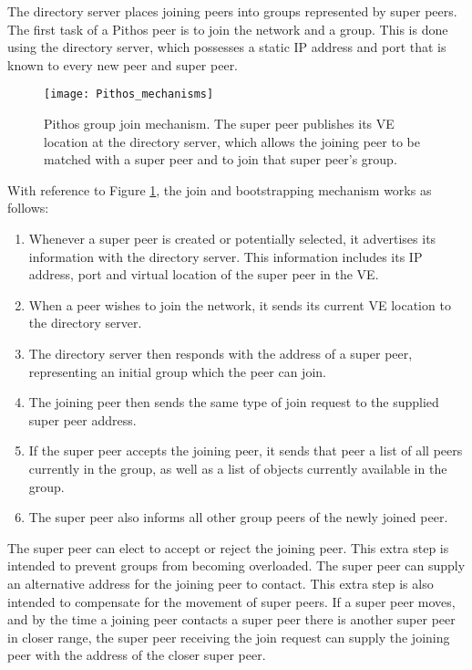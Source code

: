 The directory server places joining peers into groups represented by super peers. The first task of a Pithos peer is to join the network and a group. This is done using the directory server, which possesses a static IP address and port that is known to every new peer and super peer.

\begin{figure}[htbp]
 \centering
 \texttt{[image: Pithos\_mechanisms]}
 \caption{Pithos group join mechanism. The super peer publishes its VE location at the directory server, which allows the joining peer to be matched with a super peer and to join that super peer's group.}
 \label{fig_pithos_join}
\end{figure}
%
With reference to Figure \ref{fig_pithos_join}, the join and bootstrapping mechanism works as follows:
%
\begin{enumerate}
\item Whenever a super peer is created or potentially selected, it advertises its information with the directory server. This information includes its IP address, port and virtual location of the super peer in the VE.

\item When a peer wishes to join the network, it sends its current VE location to the directory server.

\item  The directory server then responds with the address of a super peer, representing an initial group which the peer can join.

\item The joining peer then sends the same type of join request to the supplied super peer address.

\item If the super peer accepts the joining peer, it sends that peer a list of all peers currently in the group, as well as a list of objects currently available in the group.

\item The super peer also informs all other group peers of the newly joined peer.
\end{enumerate}

The super peer can elect to accept or reject the joining peer. This extra step is intended to prevent groups from becoming overloaded. The super peer can supply an alternative address for the joining peer to contact. This extra step is also intended to compensate for the movement of super peers. If a super peer moves, and by the time a joining peer contacts a super peer there is another super peer in closer range, the super peer receiving the join request can supply the joining peer with the address of the closer super peer.

